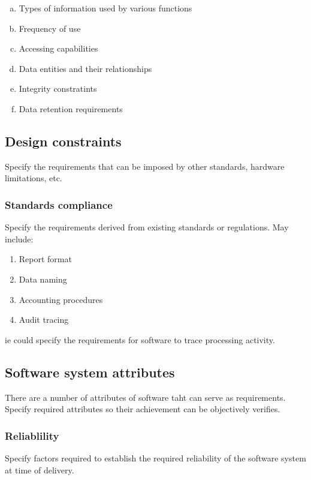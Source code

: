 \documentclass[10pt]{article}
\begin{document}
     \begin{enumerate}[(a)]
     \item{Types of information used by various functions}
     \item{Frequency of use}
     \item{Accessing capabilities}
     \item{Data entities and their relationships}
     \item{Integrity constratints}
     \item{Data retention requirements}
     \end{enumerate}

     \subsection{Design constraints}
     Specify the requirements that can be imposed by other standards, hardware limitations, etc.

     \subsubsection{Standards compliance}
     Specify the requirements derived from existing standards or regulations. May include:

     \begin{enumerate}
     \item{Report format}
     \item{Data naming}
     \item{Accounting procedures}
     \item{Audit tracing}
     \end{enumerate}

     ie could specify the requirements for software to trace processing activity.

     \subsection{Software system attributes}
     There are a number of attributes of software taht can serve as requirements. Specify required attributes so their achievement can be objectively verifies.

          \subsubsection{Reliablility}
          Specify factors required to establish the required reliability of the software system at time of delivery.
\end{document}
